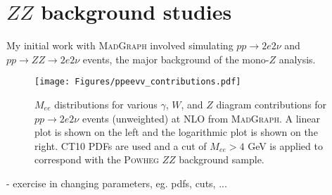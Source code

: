 \section{$ZZ$ background studies}
\label{sec:zzbackground}

My initial work with \textsc{MadGraph} involved simulating $pp \rightarrow 2e2\nu$ and $pp \rightarrow ZZ \rightarrow 2e2\nu$ events, the major background of the mono-$Z$ analysis.

\begin{figure}[h]
\centering
\texttt{[image: Figures/ppeevv\_contributions.pdf]}
\caption{$M_{ee}$ distributions for various $\gamma$, $W$, and $Z$ diagram contributions for $pp \rightarrow 2e2\nu$ events (unweighted) at NLO from \textsc{MadGraph}. A linear plot is shown on the left and the logarithmic plot is shown on the right. CT10 PDFs are used and a cut of $M_{ee} > 4$ GeV is applied to correspond with the \textsc{Powheg} $ZZ$ background sample.}
\label{fig:ppeevv_contributions}
\end{figure}

- exercise in changing parameters, eg. pdfs, cuts, ...

